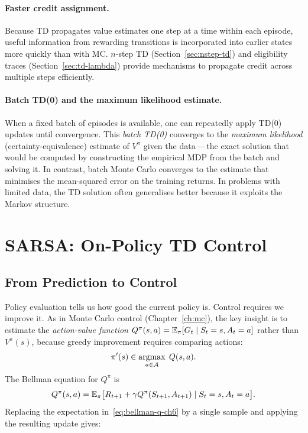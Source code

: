 \paragraph{Faster credit assignment.}
Because TD propagates value estimates one step at a time within each episode, useful information from rewarding transitions is incorporated into earlier states more quickly than with MC.  $n$-step TD (Section~\ref{sec:nstep-td}) and eligibility traces (Section~\ref{sec:td-lambda}) provide mechanisms to propagate credit across multiple steps efficiently.

\paragraph{Batch TD(0) and the maximum likelihood estimate.}
When a fixed batch of episodes is available, one can repeatedly apply TD(0) updates until convergence.  This \emph{batch TD(0)} converges to the \emph{maximum likelihood} (certainty-equivalence) estimate of $V^\pi$ given the data\,---\,the exact solution that would be computed by constructing the empirical MDP from the batch and solving it.  In contrast, batch Monte Carlo converges to the estimate that minimises the mean-squared error on the training returns.  In problems with limited data, the TD solution often generalises better because it exploits the Markov structure.

\section{SARSA: On-Policy TD Control}
\label{sec:sarsa}

\subsection{From Prediction to Control}

Policy evaluation tells us how good the current policy is.  Control requires we improve it.  As in Monte Carlo control (Chapter~\ref{ch:mc}), the key insight is to estimate the \emph{action-value function} $Q^\pi(s,a) = \operatorname{\mathbb{E}}_\pi[G_t \mid S_t=s, A_t=a]$ rather than $V^\pi(s)$, because greedy improvement requires comparing actions:
\[
\pi'(s) \in \operatorname*{argmax}_{a\in\mathcal{A}}\; Q(s,a).
\]
The Bellman equation for $Q^\pi$ is
\begin{equation}
\label{eq:bellman-q-ch6}
Q^\pi(s,a) = \operatorname{\mathbb{E}}_\pi\bigl[R_{t+1} + \gamma Q^\pi(S_{t+1},A_{t+1}) \mid S_t=s, A_t=a\bigr].
\end{equation}
Replacing the expectation in~\eqref{eq:bellman-q-ch6} by a single sample and applying the resulting update gives:

